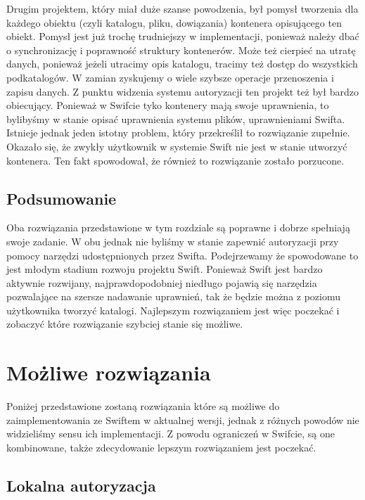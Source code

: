 	Drugim projektem, który miał duże szanse powodzenia, był pomysł tworzenia dla każdego obiektu (czyli katalogu, pliku, dowiązania) kontenera opisującego ten obiekt. Pomysł jest już trochę trudniejszy w implementacji, ponieważ należy dbać o synchronizację i poprawność struktury kontenerów. Może też cierpieć na utratę danych, ponieważ jeżeli utracimy opis katalogu, tracimy też dostęp do wszystkich podkatalogów. W zamian zyskujemy o wiele szybsze operacje przenoszenia i zapisu danych. Z punktu widzenia systemu autoryzacji ten projekt też był bardzo obiecujący. Ponieważ w Swifcie tyko kontenery mają swoje uprawnienia, to bylibyśmy w stanie opisać uprawnienia systemu plików, uprawnieniami Swifta. Istnieje jednak jeden istotny problem, który przekreślił to rozwiązanie zupełnie. Okazało się, że zwykły użytkownik w systemie Swift nie jest w stanie utworzyć kontenera. Ten fakt spowodował, że również to rozwiązanie zostało porzucone.

	\subsection{Podsumowanie}\label{sub:podsumowanie}
	
	Oba rozwiązania przedstawione w tym rozdziale są poprawne i dobrze spełniają swoje zadanie. W obu jednak nie byliśmy w stanie zapewnić autoryzacji przy pomocy narzędzi udostępnionych przez Swifta. Podejrzewamy że spowodowane to jest młodym stadium rozwoju projektu Swift. Ponieważ Swift jest bardzo aktywnie rozwijany, najprawdopodobniej niedługo pojawią się narzędzia pozwalające na szersze nadawanie uprawnień, tak że będzie można z poziomu użytkownika tworzyć katalogi. Najlepszym rozwiązaniem jest więc poczekać i zobaczyć które rozwiązanie szybciej stanie się możliwe.
	
	\section{Możliwe rozwiązania}\label{sec:mozliwe rozwiazania}

	Poniżej przedstawione zostaną rozwiązania które są możliwe do zaimplementowania ze Swiftem w aktualnej wersji, jednak z różnych powodów nie widzieliśmy sensu ich implementacji. Z powodu ograniczeń w Swifcie, są one kombinowane, także zdecydowanie lepszym rozwiązaniem jest poczekać.

	\subsection{Lokalna autoryzacja}\label{sub:lokalna autoryzacja}

